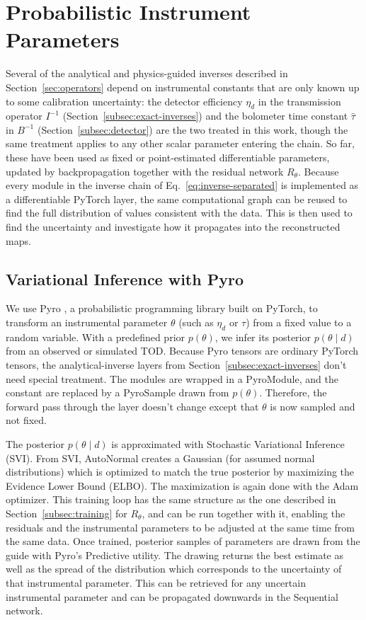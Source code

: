 \documentclass[a4paper,11pt]{article}
\begin{document}
\section{Probabilistic Instrument Parameters}
\label{sec:probabilistic}

Several of the analytical and physics-guided inverses described in Section~\ref{sec:operators} depend on instrumental constants that are only known up to some calibration uncertainty: the detector efficiency $\eta_d$ in the transmission operator $I^{-1}$ (Section~\ref{subsec:exact-inverses}) and the bolometer time constant $\hat{\tau}$ in $B^{-1}$ (Section~\ref{subsec:detector}) are the two treated in this work, though the same treatment applies to any other scalar parameter entering the chain. So far, these have been used as fixed or point-estimated differentiable parameters, updated by backpropagation together with the residual network $R_\theta$. Because every module in the inverse chain of Eq.~\ref{eq:inverse-separated} is implemented as a differentiable PyTorch layer, the same computational graph can be reused to find the full distribution of values consistent with the data. This is then used to find the uncertainty and investigate how it propagates into the reconstructed maps.

\subsection{Variational Inference with Pyro}
\label{subsec:pyro}

We use Pyro \cite{bingham2019pyro}, a probabilistic programming library built on PyTorch, to transform an instrumental parameter $\theta$ (such as $\eta_d$ or $\tau$) from a fixed value to a random variable. With a predefined prior $p(\theta)$, we infer its posterior $p(\theta \mid d)$ from an observed or simulated TOD. Because Pyro tensors are ordinary PyTorch tensors, the analytical-inverse layers from Section~\ref{subsec:exact-inverses} don't need special treatment. The modules are wrapped in a PyroModule, and the constant are replaced by a PyroSample drawn from $p(\theta)$. Therefore, the forward pass through the layer doesn't change except that $\theta$ is now sampled and not fixed.

The posterior $p(\theta \mid d)$ is approximated with Stochastic Variational Inference (SVI). From SVI, AutoNormal creates a Gaussian (for assumed normal distributions) which is optimized to match the true posterior by maximizing the Evidence Lower Bound (ELBO). The maximization is again done with the Adam optimizer. This training loop has the same structure as the one described in Section~\ref{subsec:training} for $R_\theta$, and can be run together with it, enabling the residuals and the instrumental parameters to be adjusted at the same time from the same data. Once trained, posterior samples of parameters are drawn from the guide with Pyro's Predictive utility. The drawing returns the best estimate as well as the spread of the distribution which corresponds to the uncertainty of that instrumental parameter. This can be retrieved for any uncertain instrumental parameter and can be propagated downwards in the Sequential network.
\end{document}
